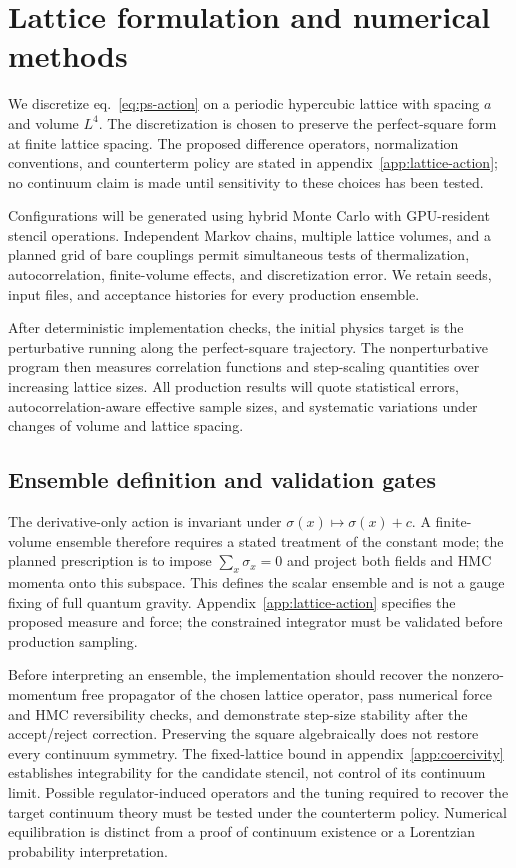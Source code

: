 \section{Lattice formulation and numerical methods}
\label{sec:numerics}

We discretize eq.~\eqref{eq:ps-action} on a periodic hypercubic lattice with spacing $a$ and volume $L^4$.  The discretization is chosen to preserve the perfect-square form at finite lattice spacing.  The proposed difference operators, normalization conventions, and counterterm policy are stated in appendix~\ref{app:lattice-action}; no continuum claim is made until sensitivity to these choices has been tested.

Configurations will be generated using hybrid Monte Carlo with GPU-resident stencil operations.  Independent Markov chains, multiple lattice volumes, and a planned grid of bare couplings permit simultaneous tests of thermalization, autocorrelation, finite-volume effects, and discretization error.  We retain seeds, input files, and acceptance histories for every production ensemble.

After deterministic implementation checks, the initial physics target is the perturbative running along the perfect-square trajectory.  The nonperturbative program then measures correlation functions and step-scaling quantities over increasing lattice sizes.  All production results will quote statistical errors, autocorrelation-aware effective sample sizes, and systematic variations under changes of volume and lattice spacing.


\subsection{Ensemble definition and validation gates}
\label{sec:ensemble-validation}

The derivative-only action is invariant under $\sigma(x)\mapsto\sigma(x)+c$.  A finite-volume ensemble therefore requires a stated treatment of the constant mode; the planned prescription is to impose $\sum_x\sigma_x=0$ and project both fields and HMC momenta onto this subspace.  This defines the scalar ensemble and is not a gauge fixing of full quantum gravity.  Appendix~\ref{app:lattice-action} specifies the proposed measure and force; the constrained integrator must be validated before production sampling.

Before interpreting an ensemble, the implementation should recover the nonzero-momentum free propagator of the chosen lattice operator, pass numerical force and HMC reversibility checks, and demonstrate step-size stability after the accept/reject correction.  Preserving the square algebraically does not restore every continuum symmetry.  The fixed-lattice bound in appendix~\ref{app:coercivity} establishes integrability for the candidate stencil, not control of its continuum limit.  Possible regulator-induced operators and the tuning required to recover the target continuum theory must be tested under the counterterm policy.  Numerical equilibration is distinct from a proof of continuum existence or a Lorentzian probability interpretation.

